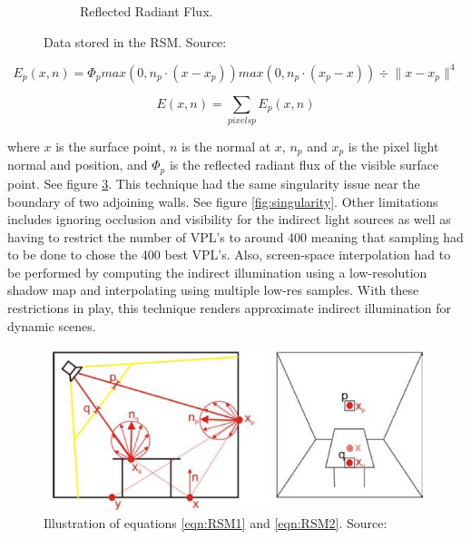\begin{figure}
\begin{subfigure}[b]{0.4\textwidth}
                \caption{Reflected Radiant Flux.}
                \label{fig:RSM3}
        \end{subfigure}
        \caption{Data stored in the RSM. Source: \protect\cite{Dachsbacher2005}}\label{fig:RSM}
\end{figure}


\begin{equation}
E_{p} (x,n) = \Phi_{p} {max(0, n_{p} \cdot (x-x_{p})) max(0, n_{p} \cdot (x_{p} - x))  } \div {\| x-x_{p} \|^{4} } \label{eqn:RSM1}
\end{equation}

\begin{equation}
E(x,n) = \sum_{pixels p} E_{p}(x,n) \label{eqn:RSM2}
\end{equation}

where $x$ is the surface point, $n$ is the normal at $x$, $n_{p}$ and $x_{p}$ is the pixel light normal and position, and $\Phi_{p}$ is the reflected radiant flux of the visible surface point.  See figure \ref{fig:RSMcalc}.  This technique had the same singularity issue near the boundary of two adjoining walls.  See figure \ref{fig:singularity}.  Other limitations includes ignoring occlusion and visibility for the indirect light sources as well as having to restrict the number of VPL's to around 400 meaning that sampling had to be done to chose the 400 best VPL's.  Also, screen-space interpolation had to be performed by computing the indirect illumination using a low-resolution shadow map and interpolating using multiple low-res samples.  With these restrictions in play, this technique renders approximate indirect illumination for dynamic scenes.  

\begin{figure}[h!]
  \centering
    \includegraphics[width=1.0\textwidth]{RSMcalc.jpg}
  \caption{Illustration of equations \ref{eqn:RSM1} and \ref{eqn:RSM2}. Source: \protect\cite{Dachsbacher2005}}
	\label{fig:RSMcalc}
\end{figure}

